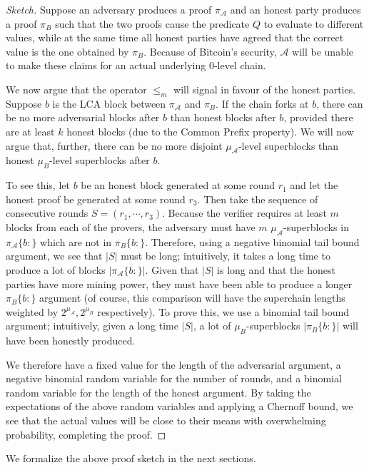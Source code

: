 \begin{proof}[Sketch]
Suppose an adversary produces a proof $\pi_\mathcal{A}$ and an honest
party produces a proof $\pi_B$ such that the two proofs cause the predicate $Q$
to evaluate to different values, while at the same time all honest parties have
agreed that the correct value is the one obtained by $\pi_B$. Because of
Bitcoin's security, $\mathcal{A}$ will be unable to make these claims for an
actual underlying 0-level chain.

We now argue that the operator $\leq_m$ will
signal in favour of the honest parties.
Suppose $b$ is the LCA block between $\pi_\mathcal{A}$ and $\pi_B$. If the chain
forks at $b$, there can be no more adversarial blocks after $b$ than honest
blocks after $b$, provided there are at least $k$ honest blocks (due to the
Common Prefix property). We will now argue that, further, there can be no more
disjoint $\mu_\mathcal{A}$-level superblocks than honest $\mu_B$-level
superblocks after $b$.

To see this, let $b$ be an honest block generated at some round $r_1$ and let
the honest proof be generated at some round $r_3$. Then take the sequence
of consecutive rounds $S = (r_1, \cdots, r_3)$. Because the verifier requires at
least $m$ blocks from each of the provers, the adversary must have $m$
$\mu_\mathcal{A}$-superblocks in $\pi_\mathcal{A}\{b:\}$ which are not in
$\pi_B\{b:\}$. Therefore, using a negative binomial tail bound argument, we see
that $|S|$ must be long; intuitively, it takes a long time to produce a lot of
blocks $|\pi_\mathcal{A}\{b:\}|$. Given that $|S|$ is long and that the honest
parties have more mining power, they must have been able to produce a longer
$\pi_B\{b:\}$ argument (of course, this comparison will have the superchain
lengths weighted by $2^{\mu_\mathcal{A}}, 2^{\mu_B}$ respectively). To prove
this, we use a binomial tail bound argument; intuitively, given a long time
$|S|$, a lot of $\mu_B$-superblocks $|\pi_B\{b:\}|$ will have been honestly
produced.

We therefore have a fixed value for the length of the adversarial argument, a
negative binomial random variable for the number of rounds, and a binomial
random variable for the length of the honest argument. By taking the
expectations of the above random variables and applying a Chernoff bound, we see
that the actual values will be close to their means with overwhelming
probability, completing the proof.
\end{proof}

We formalize the above proof sketch in the next sections.

